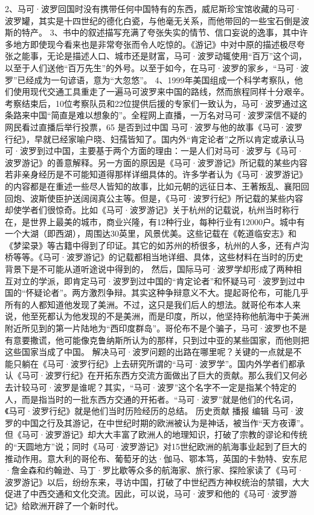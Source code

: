 \documentclass[12pt,UTF8]{ctexbook}
\begin{document}
2、马可·波罗回国时没有携带任何中国特有的东西，威尼斯珍宝馆收藏的马可·波罗罐，其实是十四世纪的德化白瓷，与他毫无关系，而他带回的一些宝石倒是波斯的特产。
3、书中的叙述描写充满了夸张失实的情节、信口妄说的逸事，其中许多地方即使现今看来也是非常夸张而令人吃惊的。《游记》中对中原的描述极尽夸张之能事，无论是描述人口、城市还是财富，马可·波罗动辄使用“百万”这个词，以至于人们送他“百万先生”的外号。以至于如今，在马可·波罗的家乡，“马可·波罗”已经成为一句谚语，意为“大忽悠”。
4、1999年美国组成一个科学考察队，他们使用现代交通工具重走了一遍马可波罗来中国的路线，然而旅程同样十分艰辛。考察结束后，10位考察队员和22位提供后援的专家们一致认为，马可·波罗通过这条路来中国“简直是难以想象的”。全程网上直播，一万名对马可·波罗深信不疑的网民看过直播后举行投票，65%
是否到过中国
马可·波罗与他的故事《马可·波罗行纪》，早就已经家喻户晓、妇孺皆知了。国内外“肯定论者”之所以肯定或承认马可·波罗到过中国，主要基于两个方面的理由：一是人们对马可·波罗与《马可·波罗游记》的善意解释。另一方面的原因是《马可·波罗游记》所记载的某些内容若非亲身经历是不可能知道得那样详细具体的。许多学者认为《马可·波罗游记》的内容都是在重述一些尽人皆知的故事，比如元朝的远征日本、王著叛乱、襄阳回回炮、波斯使臣护送阔阔真公主等。但是，《马可·波罗行纪》所记载的某些内容却使学者们很惊奇。比如《马可·波罗游记》关于杭州的记载说，杭州当时称行在，是世界上最美的城市，商业兴隆，有12种行业，每种行业有12000户。城中有一个大湖（即西湖），周围达30英里，风景优美。这些记载在《乾道临安志》和《梦梁录》等古籍中得到了印证。其它的如苏州的桥很多，杭州的人多，还有卢沟桥等等。《马可·波罗游记》的记载都相当地详细、具体，这些材料在当时的历史背景下是不可能从道听途说中得到的，
然后，国际马可·波罗学却形成了两种相互对立的学派，即肯定马可·波罗到过中国的“肯定论者”和怀疑马可·波罗到过中国的“怀疑论者”。两方激烈争辩。其实这种争辩意义不大。提起哥伦布，可能几乎所有的人都知道他发现了美洲。不过，这只是我们后人的想法。就哥伦布本人来说，他至死都认为他发现的不是美洲，而是印度，所以，他坚持称他航海中于美洲附近所见到的第一片陆地为“西印度群岛”。哥伦布不是个骗子，马可·波罗也不是有意要撒谎，他可能像克鲁纳斯所认为的那样，只到过中亚的某些国家，而他则把这些国家当成了中国。
解决马可·波罗问题的出路在哪里呢？关键的一点就是不能只躺在《马可·波罗行纪》上去研究所谓的“马可·波罗学”。国内外学者们都承认《马可·波罗行纪》在开拓东西方交流方面做出了巨大的贡献。那么我们又何必去计较马可·波罗是谁呢？其实，“马可·波罗”这个名字不一定是指某个特定的人，而是指当时的一批东西方交通的开拓者。“马可·波罗”就是他们的代名词，《马可·波罗行纪》就是他们当时历险经历的总结。
历史贡献
播报
编辑
马可·波罗的中国之行及其游记，在中世纪时期的欧洲被认为是神话，被当作“天方夜谭”。但《马可·波罗游记》却大大丰富了欧洲人的地理知识，打破了宗教的谬论和传统的“天圆地方”说；同时《马可·波罗游记》对15世纪欧洲的航海事业起到了巨大的推动作用。意大利的哥伦布、葡萄牙的达·伽马、鄂本笃，英国的卡勃特、安东尼·詹金森和约翰逊、马丁·罗比歇等众多的航海家、旅行家、探险家读了《马可·波罗游记》以后，纷纷东来，寻访中国，打破了中世纪西方神权统治的禁锢，大大促进了中西交通和文化交流。因此，可以说，马可·波罗和他的《马可·波罗游记》给欧洲开辟了一个新时代。
\end{document}
